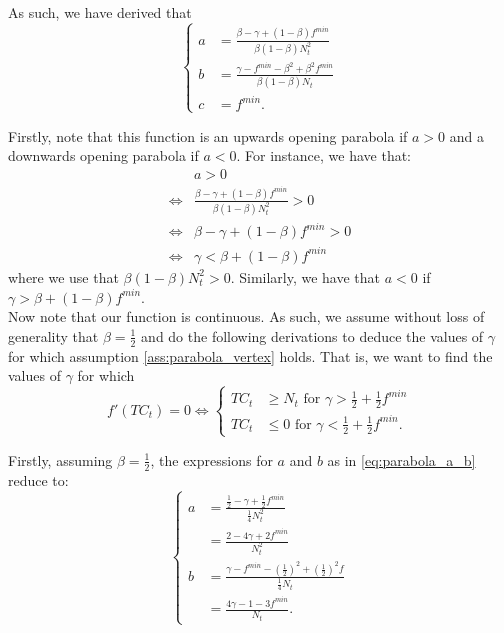 \documentclass[12pt]{article}
\begin{document}
\begin{appendices}
        As such, we have derived that
        \begin{equation} \label{eq:parabola_a_b}
		    \begin{cases}
		        a &= \frac{\beta - \gamma + (1-\beta)f^{min}}{\beta(1-\beta)N_t^2} \\
		        b &= \frac{\gamma - f^{min} - \beta^2 + \beta^2 f^{min}}{\beta(1-\beta)N_t} \\
		        c &= f^{min}.
		    \end{cases}
		\end{equation}
        
        Firstly, note that this function is an upwards opening parabola if $a>0$ and a downwards opening parabola if $a<0$. For instance, we have that:
        \begin{align*}
            & a > 0 \\
            \iff & \frac{\beta - \gamma + (1-\beta)f^{min}}{\beta(1-\beta)N_t^2} > 0 \\
            \iff & \beta - \gamma + (1-\beta)f^{min} > 0 \\
            \iff & \gamma < \beta + (1-\beta)f^{min}
        \end{align*}
        where we use that $\beta(1-\beta)N_t^2 > 0$. Similarly, we have that $a < 0$ if $\gamma > \beta + (1-\beta)f^{min}$. \\
        
        Now note that our function is continuous. As such, we assume without loss of generality that $\beta = \frac{1}{2}$ and do the following derivations to deduce the values of $\gamma$ for which assumption \ref{ass:parabola_vertex} holds. That is, we want to find the values of $\gamma$ for which
        \begin{equation*}
            f'(TC_t) = 0 \iff 
		    \begin{cases}
		        TC_t &\geq N_t \text{ for } \gamma > \frac{1}{2} + \frac{1}{2}f^{min} \\
		        TC_t &\leq 0 \text{ for } \gamma < \frac{1}{2} + \frac{1}{2}f^{min}.
		    \end{cases}
		\end{equation*}
		
		Firstly, assuming $\beta = \frac{1}{2}$, the expressions for $a$ and $b$ as in \eqref{eq:parabola_a_b} reduce to:
		\begin{equation} \label{eq:parabola_a_b_reduced}
		    \begin{cases}
		        a &= \frac{\frac{1}{2} - \gamma + \frac{1}{2}f^{min}}{\frac{1}{4}N_t^2} \\
		        &= \frac{2 - 4\gamma + 2f^{min}}{N_t^2} \\
		        b &= \frac{\gamma - f^{min} - \left(\frac{1}{2}\right)^2 + \left(\frac{1}{2}\right)^2 f}{\frac{1}{4}N_t} \\
		        &= \frac{4\gamma - 1 - 3f^{min}}{N_t}.
		    \end{cases}
		\end{equation}
		

\end{appendices}
\end{document}
